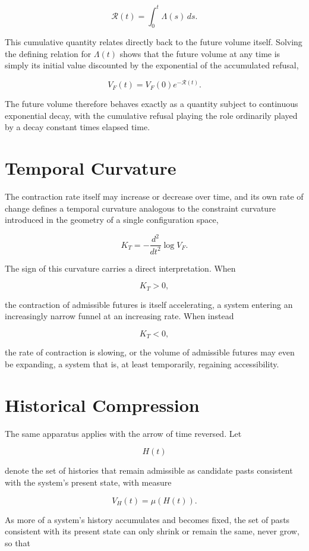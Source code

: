 \documentclass[11pt,oneside]{book}
\theoremstyle{plain}
\theoremstyle{definition}
\theoremstyle{remark}
\begin{document}
\[
\mathcal R(t)
=
\int_0^t
\Lambda(s)\,ds.
\]

This cumulative quantity relates directly back to the future volume itself. Solving the defining relation for \(\Lambda(t)\) shows that the future volume at any time is simply its initial value discounted by the exponential of the accumulated refusal,

\[
V_F(t)
=
V_F(0)e^{-\mathcal R(t)}.
\]

The future volume therefore behaves exactly as a quantity subject to continuous exponential decay, with the cumulative refusal playing the role ordinarily played by a decay constant times elapsed time.

\section{Temporal Curvature}

The contraction rate itself may increase or decrease over time, and its own rate of change defines a temporal curvature analogous to the constraint curvature introduced in the geometry of a single configuration space,

\[
K_T
=
-
\frac{d^2}{dt^2}
\log V_F.
\]

The sign of this curvature carries a direct interpretation. When

\[
K_T>0,
\]

the contraction of admissible futures is itself accelerating, a system entering an increasingly narrow funnel at an increasing rate. When instead

\[
K_T<0,
\]

the rate of contraction is slowing, or the volume of admissible futures may even be expanding, a system that is, at least temporarily, regaining accessibility.

\section{Historical Compression}

The same apparatus applies with the arrow of time reversed. Let

\[
H(t)
\]

denote the set of histories that remain admissible as candidate pasts consistent with the system's present state, with measure

\[
V_H(t)
=
\mu(H(t)).
\]

As more of a system's history accumulates and becomes fixed, the set of pasts consistent with its present state can only shrink or remain the same, never grow, so that
\end{document}
